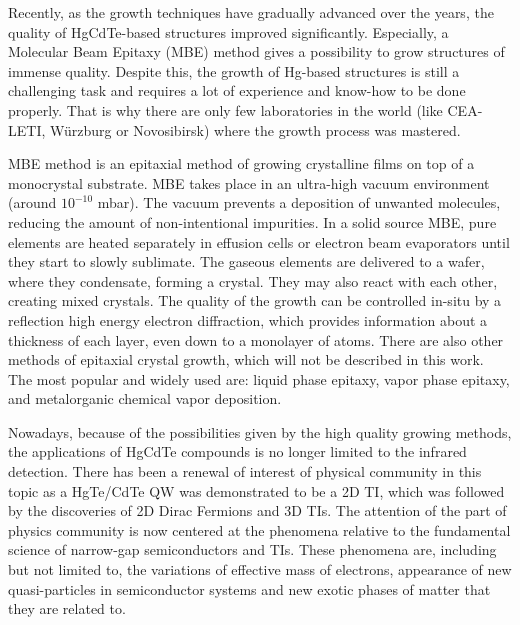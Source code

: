 \documentclass[titlepage,a4paper]{book}
\begin{document}
Recently, as the growth techniques have gradually advanced over the years, the quality of HgCdTe-based structures improved significantly. Especially, a Molecular Beam Epitaxy (MBE) method gives a possibility to grow structures of immense quality. Despite this, the growth of Hg-based structures is still a challenging task and requires a lot of experience and know-how to be done properly. That is why there are only few laboratories in the world (like CEA-LETI, Würzburg or Novosibirsk) where the growth process was mastered.

MBE method is an epitaxial method of growing crystalline films on top of a monocrystal substrate. MBE takes place in an ultra-high vacuum environment (around $10^{-10}$ mbar). The vacuum prevents a deposition of unwanted molecules, reducing the amount of non-intentional impurities. In a solid source MBE, pure elements are heated separately in effusion cells or electron beam evaporators until they start to slowly sublimate. The gaseous elements are delivered to a wafer, where they condensate, forming a crystal. They may also react with each other, creating mixed crystals. The quality of the growth can be controlled in-situ by a reflection high energy electron diffraction, which provides information about a thickness of each layer, even down to a monolayer of atoms. There are also other methods of epitaxial crystal growth, which will not be described in this work. The most popular and widely used are: liquid phase epitaxy, vapor phase epitaxy, and metalorganic chemical vapor deposition.

Nowadays, because of the possibilities given by the high quality growing methods, the applications of HgCdTe compounds is no longer limited to the infrared detection. There has been a renewal of interest of physical community in this topic as a HgTe/CdTe QW was demonstrated to be a 2D TI, which was followed by the discoveries of 2D Dirac Fermions and 3D TIs. The attention of the part of physics community is now centered at the phenomena relative to the fundamental science of narrow-gap semiconductors and TIs. These phenomena are, including but not limited to, the variations of effective mass of electrons, appearance of new quasi-particles in semiconductor systems and new exotic phases of matter that they are related to. 
\end{document}
